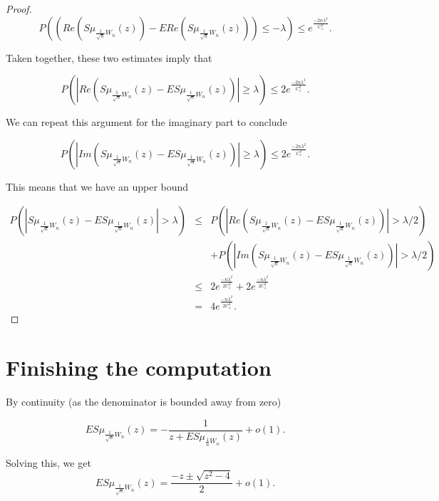 \documentclass[12pt,a4paper,leqno]{report}
\theoremstyle{plain}
\theoremstyle{definition}
\theoremstyle{remark}
\begin{document}
\begin{proof}
\begin{equation*}
P\left((Re(S\mu_{\frac{1}{\sqrt{n}}W_n}(z))-ERe(S\mu_{\frac{1}{\sqrt{n}}W_n}(z))) \leq  -\lambda \right) \leq
e^{\frac{-2n\lambda^2}{C_z^2}}.
\end{equation*}

Taken together, these two estimates imply that

\begin{equation*}
P\left(|Re(S\mu_{\frac{1}{\sqrt{n}}W_n}(z)-ES\mu_{\frac{1}{\sqrt{n}}W_n}(z))| \geq  \lambda \right)  \leq 2
e^{\frac{-2n\lambda^2}{C_z^2}}.
\end{equation*}

We can repeat this argument for the imaginary part to conclude

\begin{equation*}
P\left(|Im(S\mu_{\frac{1}{\sqrt{n}}W_n}(z)-ES\mu_{\frac{1}{\sqrt{n}}W_n}(z))| \geq  \lambda \right)  \leq 2
e^{\frac{-2n\lambda^2}{C_z^2}}.
\end{equation*}

This means that we have an upper bound

\begin{eqnarray*}
P(|S\mu_{\frac{1}{\sqrt{n}}W_n}(z)- ES\mu_{\frac{1}{\sqrt{n}}W_n}(z)|>\lambda) & \leq &
P(|Re(S\mu_{\frac{1}{\sqrt{n}}W_n}(z)- ES\mu_{\frac{1}{\sqrt{n}}W_n}(z))|>\lambda/2) \\ & &+ 
P(|Im(S\mu_{\frac{1}{\sqrt{n}}W_n}(z)- ES\mu_{\frac{1}{\sqrt{n}}W_n}(z))|>\lambda/2)\\
& \leq & 2
e^{\frac{-n\lambda^2}{2C_z^2}} + 2
e^{\frac{-n\lambda^2}{2C_z^2}}\\
& = & 4
e^{\frac{-n\lambda^2}{2C_z^2}}.
\end{eqnarray*}

\end{proof}

\section{Finishing the computation}

By continuity (as the denominator is bounded away from zero) 

\begin{equation*}
ES\mu_{\frac{1}{\sqrt{n}}W_n}(z) = -\frac{1}{z+ES\mu_{\frac{1}{n}W_n}(z)} + o(1).
\end{equation*}

Solving this, we get
\begin{equation*}
ES\mu_{\frac{1}{\sqrt{n}}W_n}(z) = \frac{-z \pm \sqrt{z^2 - 4}}{2} +o(1).
\end{equation*}
\end{document}
